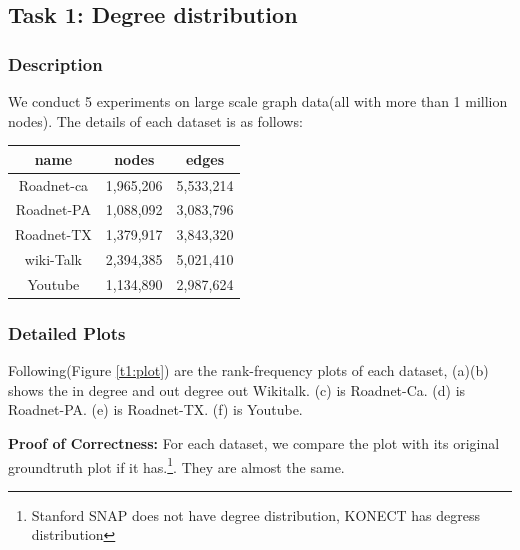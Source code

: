 \subsection{Task 1: Degree distribution}

\subsubsection{Description}
We conduct 5 experiments on large scale graph data(all with more than 1 million nodes). The details of each dataset is as follows: \\

\begin{center}
\begin{tabular}{| c | c | c |}
    \hline
    name & nodes & edges \\ \hline
    Roadnet-ca & 1,965,206 & 5,533,214 \\ \hline
    Roadnet-PA & 1,088,092 & 3,083,796 \\ \hline
    Roadnet-TX & 1,379,917 & 3,843,320 \\ \hline
    wiki-Talk & 2,394,385 & 5,021,410 \\ \hline
    Youtube & 1,134,890 & 2,987,624 \\ \hline
\end{tabular}
\end{center}

\subsubsection{Detailed Plots}
Following(Figure \ref{t1:plot}) are the rank-frequency plots of each dataset, (a)(b) shows the in degree and out degree out Wikitalk. (c) is Roadnet-Ca. (d) is Roadnet-PA. (e) is Roadnet-TX. (f) is Youtube. 

{\bf Proof of Correctness:} For each dataset, we compare the plot with its original groundtruth plot if it has.\footnote{Stanford SNAP does not have degree distribution, KONECT has degress distribution}. They are almost the same. 

